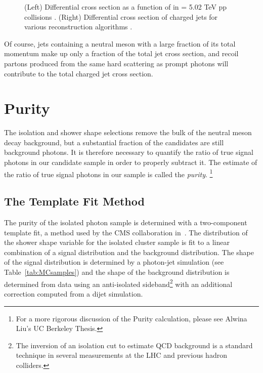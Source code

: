 \begin{figure}[hbtp]
\caption{(Left) Differential cross section as a function of \ptgamma in \sqrts = 5.02 TeV pp collisions \cite{Acharya2019}. (Right) Differential cross section of charged jets for various reconstruction algorithms \cite{ALICECollaboration2015}.}
	\label{fig:cross_section_camparison}
\end{figure}
 
Of course, jets containing a neutral meson with a large fraction of its total momentum make up only a fraction of the total jet cross section, and recoil partons produced from the same hard scattering as prompt photons will contribute to the total charged jet cross section. 





\section{Purity}
\label{sec:purity}
The isolation and shower shape selections remove the bulk of the neutral meson decay background, but a substantial fraction of the \gammaiso candidates are still background photons. It is therefore necessary to quantify the ratio of true signal photons in our candidate sample in order to properly subtract it. The estimate of the ratio of true signal photons in our \gammaiso sample is called the \textit{purity}. \footnote{For a more rigorous discussion of the Purity calculation, please see Alwina Liu's UC Berkeley Thesis.}

\subsection{The Template Fit Method}
The purity of the isolated photon sample is determined with a two-component template fit, a method used by the CMS collaboration in~\cite{Sirunyan:2017qhf}. The distribution of the shower shape variable for the isolated cluster sample is fit to a linear combination of a signal distribution and the background distribution. The shape of the signal distribution is determined by a photon-jet simulation (see Table~\ref{tab:MCsamples}) and the shape of the background distribution is determined from data using an anti-isolated sideband\footnote{The inversion of an isolation cut to estimate QCD background is a standard technique in several measurements at the LHC and previous hadron colliders.} with an additional correction computed from a dijet simulation. 

